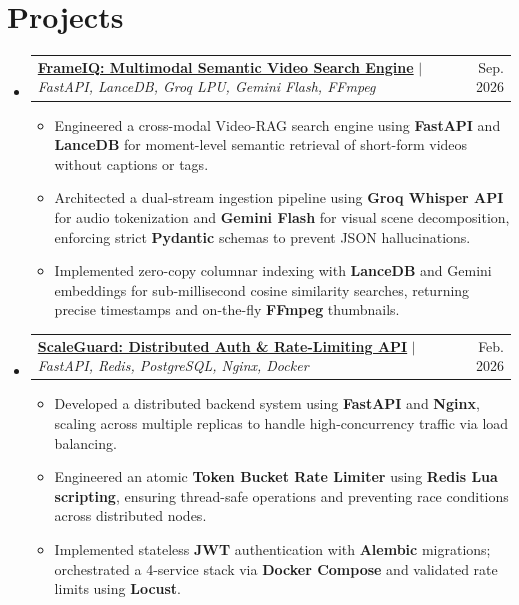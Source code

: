 \documentclass[letterpaper,11pt]{article}
\makeatletter
\newcommand{\resumeItem}[1]{
  \item\small{
    {#1 \vspace{-3pt}}
  }
}
\newcommand{\resumeProjectHeading}[2]{
    \item
    \begin{tabular*}{0.97\textwidth}{l@{\extracolsep{\fill}}r}
      \small#1 & #2 \\
    \end{tabular*}\vspace{-7pt}
}
\newcommand{\resumeSubHeadingListStart}{\begin{itemize}[leftmargin=0.15in, label={}]}
\newcommand{\resumeSubHeadingListEnd}{\end{itemize}}
\newcommand{\resumeItemListStart}{\begin{itemize}}
\newcommand{\resumeItemListEnd}{\end{itemize}\vspace{-6pt}}
\makeatother
\begin{document}
\section{Projects}
\resumeSubHeadingListStart
\resumeProjectHeading
{\href{https://github.com/manit989/FrameIQ-minimal}{\textbf{FrameIQ: Multimodal Semantic Video Search Engine}} $|$ \emph{FastAPI, LanceDB, Groq LPU, Gemini Flash, FFmpeg}}{Sep. 2026}
\resumeItemListStart
\resumeItem{Engineered a cross-modal Video-RAG search engine using \textbf{FastAPI} and \textbf{LanceDB} for moment-level semantic retrieval of short-form videos without captions or tags.}
\resumeItem{Architected a dual-stream ingestion pipeline using \textbf{Groq Whisper API} for audio tokenization and \textbf{Gemini Flash} for visual scene decomposition, enforcing strict \textbf{Pydantic} schemas to prevent JSON hallucinations.}
\resumeItem{Implemented zero-copy columnar indexing with \textbf{LanceDB} and Gemini embeddings for sub-millisecond cosine similarity searches, returning precise timestamps and on-the-fly \textbf{FFmpeg} thumbnails.}
\resumeItemListEnd
\resumeProjectHeading
{\href{https://github.com/manit989/scaleguard-api}{\textbf{ScaleGuard: Distributed Auth \& Rate-Limiting API}} $|$ \emph{FastAPI, Redis, PostgreSQL, Nginx, Docker}}{Feb. 2026}
\resumeItemListStart
\resumeItem{Developed a distributed backend system using \textbf{FastAPI} and \textbf{Nginx}, scaling across multiple replicas to handle high-concurrency traffic via load balancing.}
\resumeItem{Engineered an atomic \textbf{Token Bucket Rate Limiter} using \textbf{Redis Lua scripting}, ensuring thread-safe operations and preventing race conditions across distributed nodes.}
\resumeItem{Implemented stateless \textbf{JWT} authentication with \textbf{Alembic} migrations; orchestrated a 4-service stack via \textbf{Docker Compose} and validated rate limits using \textbf{Locust}.}
\resumeItemListEnd
\resumeSubHeadingListEnd
\vspace{-14pt}

\end{document}
